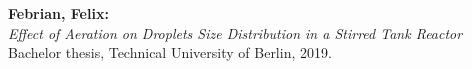 \newpage


\thispagestyle{empty}                   %

\vspace*{\fill}

\footnotesize
\noindent
\textbf{Febrian, Felix:} \\
\textit{Effect of Aeration on Droplets Size Distribution in a Stirred Tank Reactor} \\
Bachelor thesis, Technical University of Berlin, 2019.
\restoregeometry
\normalsize